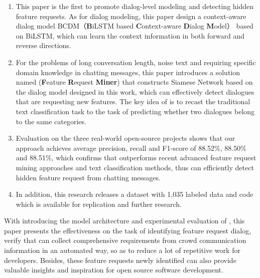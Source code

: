 \setlist[enumerate]{}%
\begin{enumerate}[nosep]
\item This paper is the first to promote dialog-level modeling and detecting hidden feature requests. As for dialog modeling, this paper design a context-aware dialog model BCDM（\textbf{B}iLSTM based \textbf{C}ontext-aware \textbf{D}ialog \textbf{M}odel） based on BiLSTM, which can learn the context information in both forward and reverse directions.
\item For the problems of long conversation length, noise text and requiring specific domain knowledge in chatting messages, this paper introduces a solution named {\tool}(\textbf{F}eature \textbf{R}equest \textbf{Miner}) that constructs Siamese Network based on the dialog model {\dm} designed in this work, which can effectively detect dialogues that are requesting new features. The key idea of {\tool} is to recast the traditional text classification task to the task of predicting whether two dialogues belong to the same categories. 
\item Evaluation on the three real-world open-source projects shows that our approach achieves average precision, recall and F1-score of 88.52\%, 88.50\% and 88.51\%, which confirms that {\tool} outperforms recent advanced feature request mining approaches and text classification methods, thus can efficiently detect hidden feature request from chatting messages.
\item In addition, this research releases a dataset with 1,035 labeled data and code which is available for replication and further research.
\end{enumerate}

With introducing the model architecture and experimental evaluation of {\tool}, this paper presents the effectiveness on the task of identifying feature request dialog, verify that {\tool} can collect comprehensive requirements from crowd communication information in an automated way, so as to reduce a lot of repetitive work for developers. Besides, these feature requests newly identified can also provide valuable insights and inspiration for open source software development.
 

